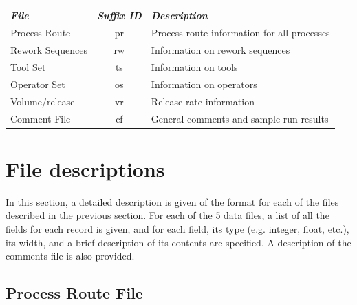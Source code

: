    \begin{center}
   \begin{tabular}{|l|c|l|}  \hline
   {\em File} & {\em Suffix ID} & {\em Description} \\ \hline
   Process Route &  pr &    Process route information for
                           all processes \\
   Rework Sequences & rw &   Information on rework sequences \\
   Tool Set   &     ts &   Information on tools  \\
   Operator Set  &  os  &  Information on operators  \\
   Volume/release & vr &   Release rate information \\ 
   Comment File  &  cf  &  General comments and sample run 
                          results  \\  \hline 
   \end{tabular}
   \end{center}
   
   \section{File descriptions}
   In this section, a detailed description is given
   of the format for each of the files described in the previous
   section. For each of the 5 data files, a list of all the fields for
   each record is given, and for each field, its type (e.g. integer,
   float, etc.), its width, and a brief description of its contents
   are specified.
   A description of the comments file is also provided. 

   
   \subsection{Process Route File}
   
